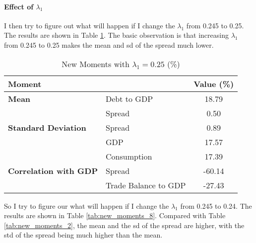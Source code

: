 \documentclass{article}
\begin{document}
\paragraph{Effect of $\lambda_1$} I then try to figure out what will happen if I change the $\lambda_1$ from
0.245 to 0.25. The results are shown in Table \ref{tab:new_moments_7}. The
basic observation is that increasing $\lambda_1$ from 0.245 to 0.25 makes the
mean and sd of the spread much lower.

\begin{table}[h]
    \centering
    \begin{tabular}{llc}
        \toprule
        \textbf{Moment}               &                      & \textbf{Value (\%)} \\
        \midrule
        \textbf{Mean}                 & Debt to GDP          & 18.79               \\
                                      & Spread               & 0.50                \\
        \addlinespace
        \textbf{Standard Deviation}   & Spread               & 0.89                \\
                                      & GDP                  & 17.57               \\
                                      & Consumption          & 17.39               \\
        \addlinespace
        \textbf{Correlation with GDP} & Spread               & -60.14              \\
                                      & Trade Balance to GDP & -27.43              \\
        \bottomrule
    \end{tabular}
    \caption{New Moments with $\lambda_1 = 0.25$ (\%)} \label{tab:new_moments_7}
\end{table}

So I try to figure our what will happen if I change the $\lambda_1$ from 0.245
to 0.24. The results are shown in Table \ref{tab:new_moments_8}. Compared with
Table \ref{tab:new_moments_2}, the mean and the sd of the spread are higher,
with the std of the spread being much higher than the mean.
\end{document}

